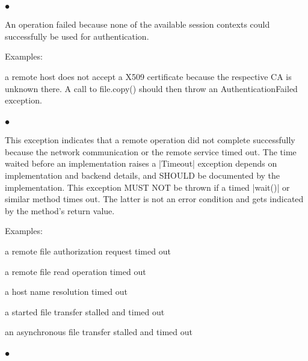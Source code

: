  
  \subsubsection*{$\bullet$ }\up
  
    An operation failed because none of the available session
    contexts could successfully be used for
    authentication.
 
    Examples:
 
    \begin{shortlist}
     \item a remote host does not accept a X509 certificate because
       the respective CA is unknown there.  A call to
       file.copy() should then throw an AuthenticationFailed
       exception.
    \end{shortlist}
 
 
  \subsubsection*{$\bullet$ }\up
 
    This exception indicates that a remote operation did not complete
    successfully because the network communication or the remote
    service timed out.  The time waited before an
    implementation raises a |Timeout| exception depends on
    implementation and backend details, and SHOULD be documented by
    the implementation.  This exception MUST NOT be
    thrown if a timed |wait()| or similar method times out. The latter is not an error condition
    and gets indicated by the method's return value.
 
    Examples:
 
    \begin{shortlist}
     \item a remote file authorization request timed out
     \item a remote file read operation timed out
     \item a host name resolution timed out
     \item a started file transfer stalled and timed out
     \item an asynchronous file transfer 
           stalled and timed out
    \end{shortlist}
 
 
  \subsubsection*{$\bullet$ }\up
 
